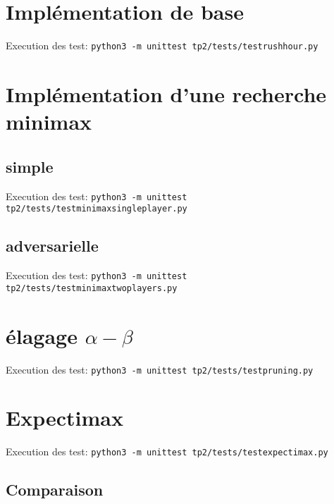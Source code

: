 \documentclass{article}
\begin{document}
    

    \section{Implémentation de base}

    Execution des test:
    \texttt{python3 -m unittest tp2/tests/testrushhour.py}

    \section{Implémentation d'une recherche minimax}

    \subsection{simple}

    Execution des test:
    \texttt{python3 -m unittest tp2/tests/testminimaxsingleplayer.py}

    \subsection{adversarielle}

    Execution des test:
    \texttt{python3 -m unittest tp2/tests/testminimaxtwoplayers.py}

    \section{élagage $\alpha-\beta$}

    Execution des test:
    \texttt{python3 -m unittest tp2/tests/testpruning.py}

    

    \section{Expectimax}

    Execution des test:
    \texttt{python3 -m unittest tp2/tests/testexpectimax.py}

    

    \subsection{Comparaison}
\end{document}
